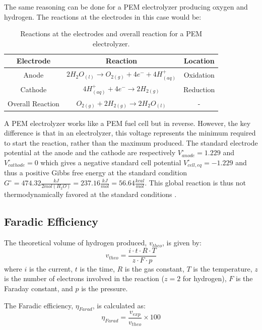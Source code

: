 The same reasoning can be done for a PEM electrolyzer producing oxygen and hydrogen. The reactions at the electrodes in this case would be:
\begin{table}[H]
\centering
\caption{Reactions at the electrodes and overall reaction for a PEM electrolyzer.}
\begin{tabular}{|c|c|c|}
\hline
\textbf{Electrode} & \textbf{Reaction} & \textbf{Location} \\ \hline
Anode & $2H_{2}O_{(l)} \xrightarrow{} O_{2(g)} + 4e^- + 4H^+_{(aq)}$ & Oxidation \\ \hline
Cathode & $4H^+_{(aq)} + 4e^- \xrightarrow{} 2H_{2(g)}$ & Reduction \\ \hline
Overall Reaction & $O_{2(g)} + 2H_{2(g)} \xrightarrow{} 2H_2O_{(l)}$ & - \\ \hline
\end{tabular}
\label{tab:PEM_electrolyzer_reactions}
\end{table}
A PEM electrolyzer works like a PEM fuel cell but in reverse.  However, the key difference is that in an electrolyzer, this voltage represents the minimum required to start the reaction, rather than the maximum produced.
The standard electrode potential at the anode and the cathode are respectively $V^{\circ}_{anode} = 1.229$ and $V^{\circ}_{cathode} = 0$ which gives a negative standard cell potential $V^{\circ}_{cell,eq} = -1.229$ and thus a positive Gibbs free energy at the standard condition $G^{\circ} = 474.32 \frac{kJ}{2 mol(H_2O)} = 237.16 \frac{kJ}{mol} = 56.64 \frac{kcal}{mol}$. 
This global reaction is thus not thermodynamically favored at the standard conditions \cite{wikiWaterElectrolysisThermo}.
\subsection{Faradic Efficiency}

The theoretical volume of hydrogen produced, $v_{theo}$, is given by:
\begin{equation}
    v_{theo} = \frac{i \cdot t \cdot R \cdot T}{z \cdot F \cdot p}
\end{equation}
where $i$ is the current, $t$ is the time, $R$ is the gas constant, $T$ is the temperature, $z$ is the number of electrons involved in the reaction ($z = 2$ for hydrogen), $F$ is the Faraday constant, and $p$ is the pressure.

The Faradic efficiency, $\eta_{Farad}$, is calculated as:
\begin{equation}
    \eta_{Farad} = \frac{v_{exp}}{v_{theo}} \times 100
\end{equation}

